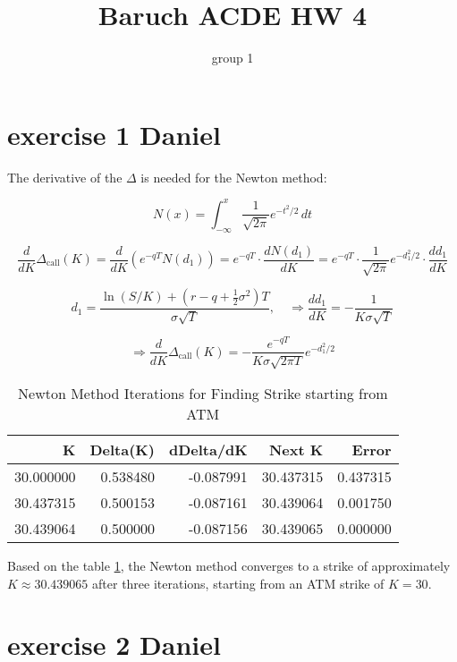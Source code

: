 \documentclass{article}
\title{Baruch ACDE HW 4}
\author{group 1}
\begin{document}
\maketitle
\tableofcontents

\section{exercise 1 Daniel}
The derivative of the $\Delta$ is needed for the Newton method:

\[
    N(x) = \int_{-\infty}^x \frac{1}{\sqrt{2\pi}} e^{-t^2/2} \, dt
\]

\[
    \frac{d}{dK} \Delta_{\text{call}}(K)
    = \frac{d}{dK} \left( e^{-qT} N(d_1) \right)
    = e^{-qT} \cdot \frac{dN(d_1)}{dK}
    = e^{-qT} \cdot \frac{1}{\sqrt{2\pi}} e^{-d_1^2/2} \cdot \frac{d d_1}{dK}
\]

\[
    d_1 = \frac{\ln(S/K) + (r - q + \frac{1}{2} \sigma^2)T}{\sigma \sqrt{T}}, \quad
    \Rightarrow \frac{d d_1}{dK} = -\frac{1}{K \sigma \sqrt{T}}
\]

\[
    \Rightarrow \frac{d}{dK} \Delta_{\text{call}}(K)
    = -\frac{e^{-qT}}{K \sigma \sqrt{2\pi T}} e^{-d_1^2/2}
\]

\begin{table}
    \centering
    \caption{Newton Method Iterations for Finding Strike starting from ATM}
    \label{tab:newton_iterations}
    \begin{tabular}{rrrrr}
        \toprule
        K         & Delta(K) & dDelta/dK & Next K    & Error    \\
        \midrule
        30.000000 & 0.538480 & -0.087991 & 30.437315 & 0.437315 \\
        30.437315 & 0.500153 & -0.087161 & 30.439064 & 0.001750 \\
        30.439064 & 0.500000 & -0.087156 & 30.439065 & 0.000000 \\
        \bottomrule
    \end{tabular}
\end{table}

Based on the table \ref{tab:newton_iterations},
the Newton method converges to a strike of approximately \( K \approx 30.439065 \)
after three iterations, starting from an ATM strike of \( K = 30 \).

\section{exercise 2 Daniel}
\end{document}
